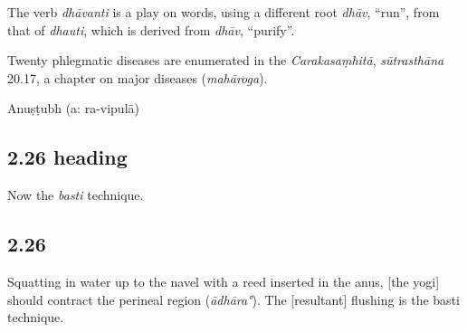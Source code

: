 \begin{ekdosis}
\begin{testimonia}[hp02_025]
\end{testimonia}

\begin{philcomm}[hp02_025]
The verb \emph{dhāvanti} is a play on words, using a different root \emph{dhāv}, “run”, from that of \emph {dhauti}, which is derived from \emph{dhāv}, “purify”.

Twenty phlegmatic diseases are enumerated in the \emph{Carakasaṃhitā}, \emph{sūtrasthāna} 20.17, a chapter on major diseases (\emph{mahāroga}). %
\end{philcomm}

\begin{metre}[hp02_025]
Anuṣṭubh (a: ra-vipulā)
\end{metre}

\subsection*{2.26 heading}
\begin{translation}[hp02_026a]
Now the \emph{basti} technique.
\end{translation}


\subsection*{2.26}
\begin{translation}[hp02_026]
Squatting in water up to the navel with a reed inserted in the anus, [the yogi] should contract the perineal region (\emph{ādhāra°}). The [resultant] flushing is the basti technique.
\end{translation}


\end{ekdosis}

